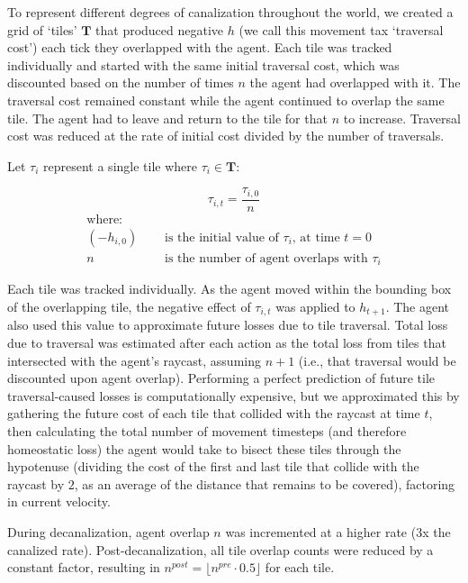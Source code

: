 To represent different degrees of canalization throughout the world, we created a grid of ‘tiles’ \(\mathbf{T}\) that produced negative \(h\) (we call this movement tax ‘traversal cost’) each tick they overlapped with the agent. Each tile was tracked individually and started with the same initial traversal cost, which was discounted based on the number of times \(n\) the agent had overlapped with it. The traversal cost remained constant while the agent continued to overlap the same tile. The agent had to leave and return to the tile for that \(n\) to increase. Traversal cost was reduced at the rate of initial cost divided by the number of traversals. 

Let \(\tau_i\) represent a single tile where \(\tau_i \in \mathbf{T}\): 

\begin{equation*}
\tau_{i,t} = \frac{\tau_{i, 0}}{n}
\end{equation*}
\begin{align*}
\text{where:} \\
(-h_{i,0}) &\quad\text{ is the initial value of }  \tau_{i} \text{, at time } t=0\\
n &\quad\text{ is the number of agent overlaps with }\tau_i
\end{align*}

Each tile was tracked individually. As the agent moved within the bounding box of the overlapping tile, the negative effect of \(\tau_{i,t}\) was applied to \(h_{t+1}\). The agent also used this value to approximate future losses due to tile traversal. Total loss due to traversal was estimated after each action as the total loss from tiles that intersected with the agent's raycast, assuming \(n+1\) (i.e., that traversal would be discounted upon agent overlap). Performing a perfect prediction of future tile traversal-caused losses is computationally expensive, but we approximated this by gathering the future cost of each tile that collided with the raycast at time \(t\), then calculating the total number of movement timesteps (and therefore homeostatic loss) the agent would take to bisect these tiles through the hypotenuse (dividing the cost of the first and last tile that collide with the raycast by \(2\), as an average of the distance that remains to be covered), factoring in current velocity.

During decanalization, agent overlap \(n\) was incremented at a higher rate (3x the canalized rate). Post-decanalization, all tile overlap counts were reduced by a constant factor, resulting in \(n^{post} = \lfloor n^{pre} \cdot 0.5 \rfloor\) for each tile.

